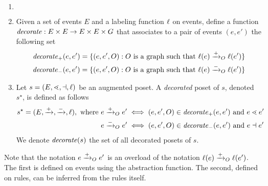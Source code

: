 \begin{definition}
  \begin{enumerate}
  \item[] $~$
  \item Given a set of events $E$ and a labeling function $\ell$ on events, define a function $\mathit{decorate}:E\times E \to E\times E\times G$ that associates to a pair of events $(e,e')$ the following set
    \begin{align*}
      \mathit{decorate}_{+}(e,e') = \{(e,e',O) : O\text{ is a graph such that }\ell(e)\mathrel{\xrightarrow{+}}_O \ell(e')\}\\
       \mathit{decorate}_{-}(e,e') = \{(e,e',O) : O\text{ is a graph such that }\ell(e)\mathrel{\xrightarrow{-}}_O \ell(e')\}
    \end{align*}

  \item Let $s = (E,\lessdot,\dashv,\ell)$ be an augmented poset. A \emph{decorated} poset of $s$, denoted $s^{\star}$, is defined as follows
    \begin{align*}
      s^{\star} = (E,\mathrel{\xrightarrow{+}},\mathrel{\xrightarrow{-}},\ell), \text{ where }
      &e\mathrel{\xrightarrow{+}}_O e' \iff (e,e',O)\in\mathit{decorate}_+(e,e')\text{ and }e\lessdot e'\\
      &e\mathrel{\xrightarrow{-}}_O e' \iff (e,e',O)\in\mathit{decorate}_-(e,e')\text{ and }e\dashv e'\\
    \end{align*}
    We denote $\mathit{decorate}(s)$ the set of all decorated posets of $s$.
  \end{enumerate}
\end{definition}

Note that the notation $e\mathrel{\xrightarrow{+}}_O e'$ is an overload of the notation $\ell(e)\mathrel{\xrightarrow{+}}_O \ell(e')$. The first is defined on events using the abstraction function. The second, defined on rules, can be inferred from the rules itself.

